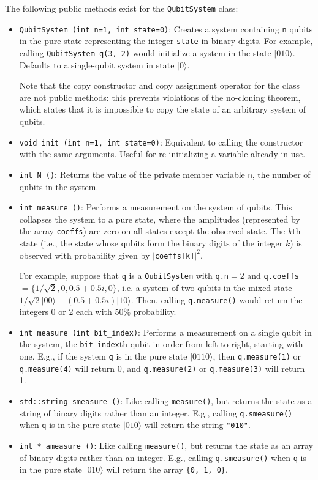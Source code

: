 \documentclass{article}
\begin{document}
The following public methods exist for the \verb~QubitSystem~ class: 
\begin{itemize}
\item \verb~QubitSystem (int n=1, int state=0)~: Creates a system containing \verb~n~ qubits in the pure state representing the integer \verb~state~ in binary digits. For example, calling \verb~QubitSystem q(3, 2)~ would initialize a system in the state $|010\rangle$. Defaults to a single-qubit system in state $|0\rangle$.

Note that the copy constructor and copy assignment operator for the class are not public methods: this prevents violations of the no-cloning theorem, which states that it is impossible to copy the state of an arbitrary system of qubits. 

\item \verb~void init (int n=1, int state=0)~: Equivalent to calling the constructor with the same arguments. Useful for re-initializing a variable already in use.

\item \verb~int N ()~: Returns the value of the private member variable \verb~n~, the number of qubits in the system. 
\item \verb~int measure ()~: Performs a measurement on the system of qubits. This collapses the system to a pure state, where the amplitudes (represented by the array \verb~coeffs~) are zero on all states except the observed state. The $k$th state (i.e., the state whose qubits form the binary digits of the integer $k$) is observed with probability given by $|$\verb~coeffs[k]~$|^2$. 

For example, suppose that \verb~q~ is a \verb~QubitSystem~ with \verb~q.n~$ = 2$ and \verb~q.coeffs~$ = \{1/\sqrt{2}, 0, 0.5 + 0.5i, 0\}$, i.e. a system of two qubits in the mixed state $1/\sqrt{2}|00\rangle + (0.5+0.5i)|10\rangle$. Then, calling \verb~q.measure()~ would return the integers 0 or 2 each with 50\% probability. 

\item \verb~int measure (int bit_index)~: Performs a measurement on a single qubit in the system, the \verb~bit_index~th qubit in order from left to right, starting with one. E.g., if the system \verb~q~ is in the pure state $|0110\rangle$, then \verb~q.measure(1)~ or \verb~q.measure(4)~ will return 0, and \verb~q.measure(2)~ or \verb~q.measure(3)~ will return 1. 

\item \verb~std::string smeasure ()~: Like calling \verb~measure()~, but returns the state as a string of binary digits rather than an integer. E.g., calling \verb~q.smeasure()~ when \verb~q~ is in the pure state $|010\rangle$ will return the string \verb~"010"~. 

\item \verb~int * ameasure ()~: Like calling \verb~measure()~, but returns the state as an array of binary digits rather than an integer. E.g., calling \verb~q.smeasure()~ when \verb~q~ is in the pure state $|010\rangle$ will return the array \verb~{0, 1, 0}~. 

\end{itemize} 
\end{document}
